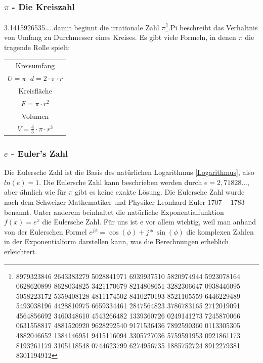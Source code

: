 \documentclass[letterpaper, titlepage]{article}
\begin{document}
\subsubsection{$\pi$ - Die Kreiszahl}\label{Die Kreiszahl}
3.1415926535\dots ..damit beginnt die irrationale Zahl $\pi$\footnote{8979323846 2643383279 5028841971 6939937510 5820974944 5923078164 0628620899 8628034825 3421170679 8214808651 3282306647 0938446095 5058223172 5359408128 4811174502 8410270193 8521105559 6446229489 5493038196 4428810975 6659334461 2847564823 3786783165 2712019091 4564856692 3460348610 4543266482 1339360726 0249141273 7245870066 0631558817 4881520920 9628292540 9171536436 7892590360 0113305305 4882046652 1384146951 9415116094 3305727036 5759591953 0921861173 8193261179 3105118548 0744623799 6274956735 1885752724 8912279381 8301194912}.Pi beschreibt das Verhältnis von Umfang zu Durchmesser eines Kreises. Es gibt viele Formeln, in denen $\pi$ die tragende Rolle spielt:


\begin{center}
\renewcommand{\arraystretch}{1.5} %
\begin{tabular}{|c|}
\hline
Kreisumfang \\
\(U = \pi \cdot d = 2 \cdot \pi \cdot r\) \\
\hline
Kreisfläche \\
\(F = \pi \cdot r^2\) \\
\hline
Volumen \\
\(V = \frac{4}{3} \cdot \pi \cdot r^3\) \\
\hline
\end{tabular}
\renewcommand{\arraystretch}{1.0} %
\end{center}

\vspace{0.35cm}

\subsubsection{$e$ - Euler's Zahl}\label{Euler's Zahl}
Die Eulersche Zahl ist die Basis des natürlichen Logarithmus \ref{Logarithmus}, also $ln(e) = 1$. Die Eulersche Zahl kann beschrieben werden durch $e = 2,71828$..., aber ähnlich wie für $\pi$ gibt es keine exakte Lösung. Die Eulersche Zahl wurde nach dem Schweizer Mathematiker und Physiker Leonhard Euler \(1707-1783\) benannt. Unter anderem beinhaltet die natürliche Exponentialfunktion $f(x) = e^x$ die Eulersche Zahl. Für uns ist e vor allem wichtig, weil man anhand von der Eulerschen Formel $e^{j\phi}=\cos(\phi)+j*\sin(\phi)$ die komplexen Zahlen in der Exponentialform darstellen kann, was die Berechnungen erheblich erleichtert.
\end{document}
